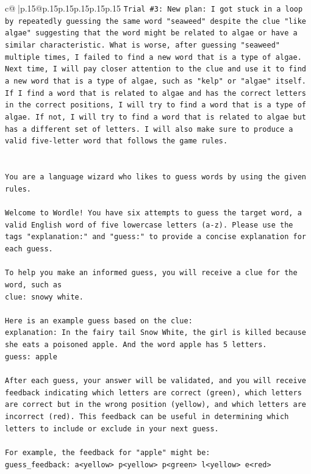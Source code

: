 \documentclass{article}
\begin{document}
{\begin{supertabular}{c@{$\;$}|p{.15\linewidth}@{}p{.15\linewidth}p{.15\linewidth}p{.15\linewidth}p{.15\linewidth}p{.15\linewidth}}
{{{\texttt{Trial \#3: New plan: I got stuck in a loop by repeatedly guessing the same word "seaweed" despite the clue "like algae" suggesting that the word might be related to algae or have a similar characteristic. What is worse, after guessing "seaweed" multiple times, I failed to find a new word that is a type of algae. Next time, I will pay closer attention to the clue and use it to find a new word that is a type of algae, such as "kelp" or "algae" itself. If I find a word that is related to algae and has the correct letters in the correct positions, I will try to find a word that is a type of algae. If not, I will try to find a word that is related to algae but has a different set of letters. I will also make sure to produce a valid five{-}letter word that follows the game rules.} \\
\\ 
\\ 
\texttt{You are a language wizard who likes to guess words by using the given rules.} \\
\\ 
\texttt{Welcome to Wordle! You have six attempts to guess the target word, a valid English word of five lowercase letters (a{-}z). Please use the tags "explanation:" and "guess:" to provide a concise explanation for each guess.} \\
\\ 
\texttt{To help you make an informed guess, you will receive a clue for the word, such as} \\
\texttt{clue: snowy white.} \\
\\ 
\texttt{Here is an example guess based on the clue:} \\
\texttt{explanation: In the fairy tail Snow White, the girl is killed because she eats a poisoned apple. And the word apple has 5 letters.} \\
\texttt{guess: apple} \\
\\ 
\texttt{After each guess, your answer will be validated, and you will receive feedback indicating which letters are correct (green), which letters are correct but in the wrong position (yellow), and which letters are incorrect (red). This feedback can be useful in determining which letters to include or exclude in your next guess.} \\
\\ 
\texttt{For example, the feedback for "apple" might be:} \\
\texttt{guess\_feedback: a<yellow> p<yellow> p<green> l<yellow> e<red>} \\
}}}
\end{supertabular}}
\end{document}
